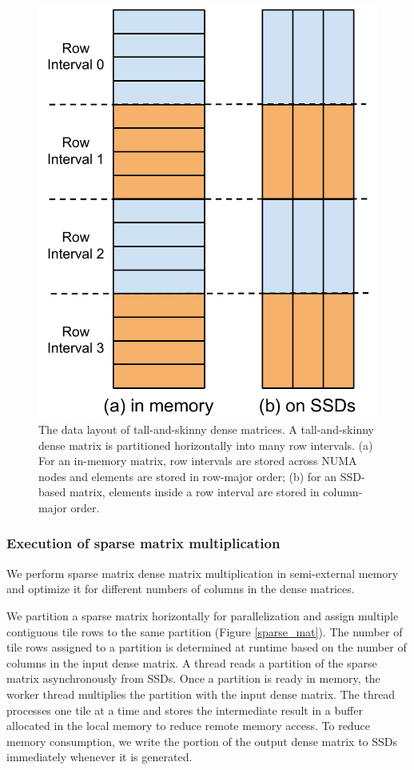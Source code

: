 \begin{figure}
\centering
\includegraphics[scale=0.4]{./dense_matrix.pdf}
\vspace{-5pt}
\caption{The data layout of tall-and-skinny dense matrices. A tall-and-skinny
dense matrix is partitioned horizontally into many row intervals.
(a) For an in-memory matrix, row intervals are stored across NUMA nodes and
elements are stored in row-major order; (b) for an SSD-based matrix, elements
inside a row interval are stored in column-major order.}
\vspace{-5pt}
\label{dense_mat}
\end{figure}

\subsubsection{Execution of sparse matrix multiplication} \label{sec:exec}
We perform sparse matrix dense matrix multiplication in semi-external memory
and optimize it for different numbers of columns in the dense matrices.

We partition a sparse matrix horizontally for parallelization and assign multiple
contiguous tile rows to the same partition (Figure \ref{sparse_mat}).
The number of tile rows assigned to a partition is determined at runtime
based on the number of columns in the input dense matrix. A thread reads
a partition of the sparse matrix asynchronously from SSDs. Once a partition
is ready in memory, the worker thread multiplies the partition with the input
dense matrix. The thread processes one tile at a time and stores
the intermediate result in a buffer allocated in the local memory to reduce
remote memory access. To reduce memory consumption,
we write the portion of the output dense matrix to SSDs immediately whenever
it is generated. 

